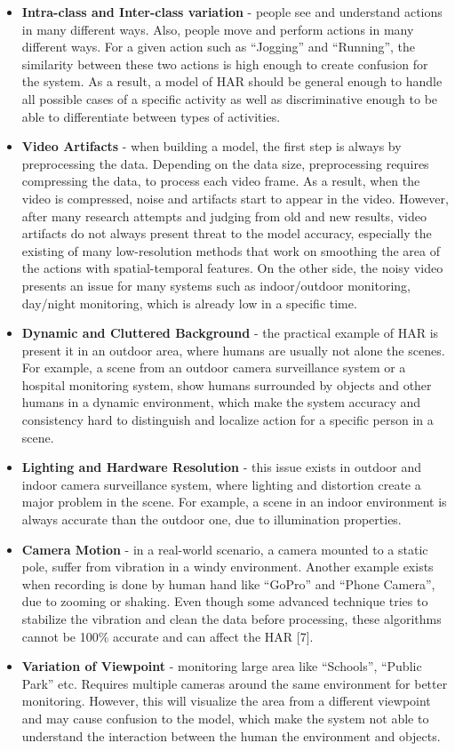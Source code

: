 \begin{itemize}
\item \textbf{Intra-class and Inter-class variation} - people see and understand actions in many different ways. Also, people move and perform actions in many different ways. For a given action such as “Jogging” and “Running”, the similarity between these two actions is high enough to create confusion for the system. As a result, a model of HAR should be general enough to handle all possible cases of a specific activity as well as discriminative enough to be able to differentiate between types of activities.
\item \textbf{Video Artifacts} - when building a model, the first step is always by preprocessing the data. Depending on the data size, preprocessing requires compressing the data, to process each video frame. As a result, when the video is compressed, noise and artifacts start to appear in the video. However, after many research attempts and judging from old and new results, video artifacts do not always present threat to the model accuracy, especially the existing of many low-resolution methods that work on smoothing the area of the actions with spatial-temporal features. On the other side, the noisy video presents an issue for many systems such as indoor/outdoor monitoring, day/night monitoring, which is already low in a specific time.
\item \textbf{Dynamic and Cluttered Background} - the practical example of HAR is present it in an outdoor area, where humans are usually not alone the scenes. For example, a scene from an outdoor camera surveillance system or a hospital monitoring system, show humans surrounded by objects and other humans in a dynamic environment, which make the system accuracy and consistency hard to distinguish and localize action for a specific person in a scene.
\item \textbf{Lighting and Hardware Resolution} - this issue exists in outdoor and indoor camera surveillance system, where lighting and distortion create a major problem in the scene. For example, a scene in an indoor environment is always accurate than the outdoor one, due to illumination properties.
\item \textbf{Camera Motion} - in a real-world scenario, a camera mounted to a static pole, suffer from vibration in a windy environment. Another example exists when recording is done by human hand like “GoPro” and “Phone Camera”, due to zooming or shaking. Even though some advanced technique tries to stabilize the vibration and clean the data before processing, these algorithms cannot be 100\% accurate and can affect the HAR [7].
\item \textbf{Variation of Viewpoint} - monitoring large area like “Schools”, “Public Park” etc. Requires multiple cameras around the same environment for better monitoring. However, this will visualize the area from a different viewpoint and may cause confusion to the model, which make the system not able to understand the interaction between the human the environment and objects.
\end{itemize}

